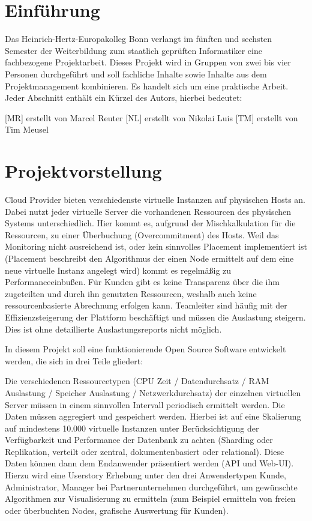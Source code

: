 \section{Einführung}
Das Heinrich-Hertz-Europakolleg Bonn verlangt im fünften und sechsten Semester
der Weiterbildung zum staatlich geprüften Informatiker eine fachbezogene
Projektarbeit. Dieses Projekt wird in Gruppen von zwei bis vier Personen
durchgeführt und soll fachliche Inhalte sowie Inhalte aus dem Projektmanagement
kombinieren. Es handelt sich um eine praktische Arbeit. Jeder Abschnitt enthält
ein Kürzel des Autors, hierbei bedeutet:
\begin{outline}
  \1 {[MR]} erstellt von Marcel Reuter
  \1 {[NL]} erstellt von Nikolai Luis
  \1 {[TM]} erstellt von Tim Meusel
\end{outline}
\tm%

\section{Projektvorstellung}
\label{subsubsec:projektvorstellung}
Cloud Provider bieten verschiedenste virtuelle Instanzen auf physischen Hosts
an. Dabei nutzt jeder virtuelle Server die vorhandenen Ressourcen des
physischen Systems unterschiedlich. Hier kommt es, aufgrund der
Mischkalkulation für die Ressourcen, zu einer Überbuchung (Overcommitment) des
Hosts. Weil das Monitoring nicht ausreichend ist, oder kein sinnvolles
Placement implementiert ist (Placement beschreibt den Algorithmus der einen
Node ermittelt auf dem eine neue virtuelle Instanz angelegt wird) kommt es
regelmäßig zu Performanceeinbußen. Für Kunden gibt es keine Transparenz über
die ihm zugeteilten und durch ihn genutzten Ressourcen, weshalb auch keine
ressourcenbasierte Abrechnung erfolgen kann. Teamleiter sind häufig mit der
Effizienzsteigerung der Plattform beschäftigt und müssen die Auslastung
steigern. Dies ist ohne detaillierte Auslastungsreports nicht möglich.

In diesem Projekt soll eine funktionierende Open Source Software entwickelt
werden, die sich in drei Teile gliedert:
\begin{outline}
  \1 Die verschiedenen Ressourcetypen (CPU Zeit / Datendurchsatz / RAM
  Auslastung / Speicher Auslastung / Netzwerkdurchsatz) der einzelnen
  virtuellen Server müssen in einem sinnvollen Intervall periodisch ermittelt
  werden.
  \1 Die Daten müssen aggregiert und gespeichert werden. Hierbei ist auf eine
  Skalierung auf mindestens 10.000 virtuelle Instanzen unter Berücksichtigung
  der Verfügbarkeit und Performance der Datenbank zu achten (Sharding oder
  Replikation, verteilt oder zentral, dokumentenbasiert oder relational).
  \1 Diese Daten können dann dem Endanwender präsentiert werden (\gls{API} und
  Web-UI). Hierzu wird eine Userstory Erhebung unter den drei Anwendertypen
  Kunde, Administrator, Manager bei Partnerunternehmen durchgeführt, um
  gewünschte Algorithmen zur Visualisierung zu ermitteln (zum Beispiel
  ermitteln von freien oder überbuchten Nodes, grafische Auswertung für Kunden).
\end{outline}

